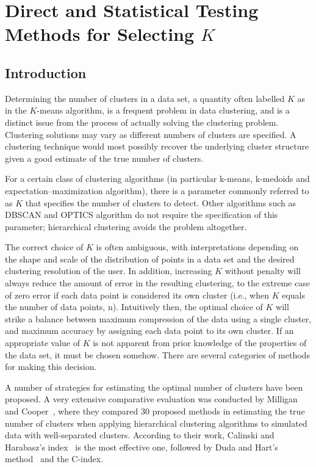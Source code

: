 \chapter{Direct and Statistical Testing Methods for Selecting $K$}\label{mywork}

\section{Introduction}
Determining the number of clusters in a data set, a quantity often labelled $K$ as in the $K$-means algorithm,
is a frequent problem in data clustering, and is a distinct issue from the process of actually solving the
clustering problem. Clustering solutions may vary as different numbers of clusters are specified.
A clustering technique would most possibly recover the underlying cluster structure given a good
estimate of the true number of clusters.

For a certain class of clustering algorithms (in particular k-means, k-medoids and expectation–maximization algorithm),
there is a parameter commonly referred to as $K$ that specifies the number of clusters to detect. Other algorithms such
as DBSCAN and OPTICS algorithm do not require the specification of this parameter; hierarchical clustering avoids the
problem altogether.

The correct choice of $K$ is often ambiguous, with interpretations depending on the shape and scale of the distribution
of points in a data set and the desired clustering resolution of the user. In addition, increasing $K$ without penalty
will always reduce the amount of error in the resulting clustering, to the extreme case of zero error if each data point
is considered its own cluster (i.e., when $K$ equals the number of data points, n). Intuitively then, the optimal choice
of $K$ will strike a balance between maximum compression of the data using a single cluster, and maximum accuracy by
assigning each data point to its own cluster. If an appropriate value of $K$ is not apparent from prior knowledge of the
properties of the data set, it must be chosen somehow. There are several categories of methods for making this decision.

A number of strategies for estimating the optimal number of clusters have been proposed.
A very extensive comparative evaluation was conducted by Milligan and Cooper~\cite{milligan85},
where they compared 30 proposed methods in estimating the true number of clusters
when applying hierarchical clustering algorithms to simulated data with well-separated clusters.
According to their work, Calinski and Harabasz’s index~\cite{Calinski1974} is the most effective one,
followed by Duda and Hart’s method~\cite{Hart73} and the C-index.

